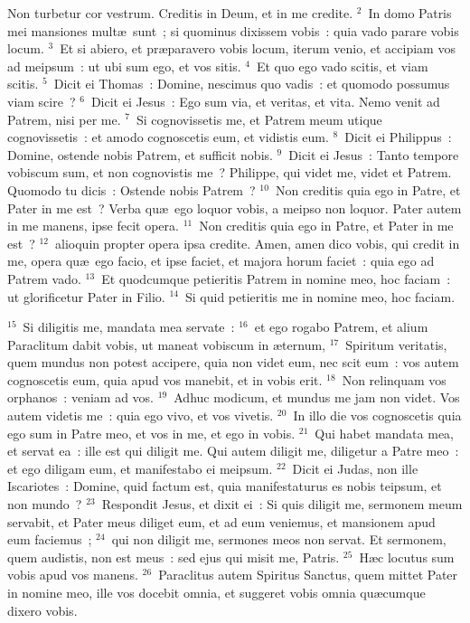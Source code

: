 \lettrine[lines=10,image=true,loversize=0.05,lraise=-0.03]{N}{}on turbetur cor vestrum. Creditis in Deum, et in me credite.
${}^{2}$~In domo Patris mei mansiones mult\ae\ sunt~; si quominus dixissem vobis~: quia vado parare vobis locum.
${}^{3}$~Et si abiero, et pr\ae paravero vobis locum, iterum venio, et accipiam vos ad meipsum~: ut ubi sum ego, et vos sitis.
${}^{4}$~Et quo ego vado scitis, et viam scitis.
${}^{5}$~Dicit ei Thomas~: Domine, nescimus quo vadis~: et quomodo possumus viam scire~?
${}^{6}$~Dicit ei Jesus~: Ego sum via, et veritas, et vita. Nemo venit ad Patrem, nisi per me.
${}^{7}$~Si cognovissetis me, et Patrem meum utique cognovissetis~: et amodo cognoscetis eum, et vidistis eum.
${}^{8}$~Dicit ei Philippus~: Domine, ostende nobis Patrem, et sufficit nobis.
${}^{9}$~Dicit ei Jesus~: Tanto tempore vobiscum sum, et non cognovistis me~? Philippe, qui videt me, videt et Patrem. Quomodo tu dicis~: Ostende nobis Patrem~?
${}^{10}$~Non creditis quia ego in Patre, et Pater in me est~? Verba qu\ae\ ego loquor vobis, a meipso non loquor. Pater autem in me manens, ipse fecit opera.
${}^{11}$~Non creditis quia ego in Patre, et Pater in me est~?
${}^{12}$~alioquin propter opera ipsa credite. Amen, amen dico vobis, qui credit in me, opera qu\ae\ ego facio, et ipse faciet, et majora horum faciet~: quia ego ad Patrem vado.
${}^{13}$~Et quodcumque petieritis Patrem in nomine meo, hoc faciam~: ut glorificetur Pater in Filio.
${}^{14}$~Si quid petieritis me in nomine meo, hoc faciam.


${}^{15}$~Si diligitis me, mandata mea servate~:
${}^{16}$~et ego rogabo Patrem, et alium Paraclitum dabit vobis, ut maneat vobiscum in \ae ternum,
${}^{17}$~Spiritum veritatis, quem mundus non potest accipere, quia non videt eum, nec scit eum~: vos autem cognoscetis eum, quia apud vos manebit, et in vobis erit.
${}^{18}$~Non relinquam vos orphanos~: veniam ad vos.
${}^{19}$~Adhuc modicum, et mundus me jam non videt. Vos autem videtis me~: quia ego vivo, et vos vivetis.
${}^{20}$~In illo die vos cognoscetis quia ego sum in Patre meo, et vos in me, et ego in vobis.
${}^{21}$~Qui habet mandata mea, et servat ea~: ille est qui diligit me. Qui autem diligit me, diligetur a Patre meo~: et ego diligam eum, et manifestabo ei meipsum.
${}^{22}$~Dicit ei Judas, non ille Iscariotes~: Domine, quid factum est, quia manifestaturus es nobis teipsum, et non mundo~?
${}^{23}$~Respondit Jesus, et dixit ei~: Si quis diligit me, sermonem meum servabit, et Pater meus diliget eum, et ad eum veniemus, et mansionem apud eum faciemus~;
${}^{24}$~qui non diligit me, sermones meos non servat. Et sermonem, quem audistis, non est meus~: sed ejus qui misit me, Patris.
${}^{25}$~H\ae c locutus sum vobis apud vos manens.
${}^{26}$~Paraclitus autem Spiritus Sanctus, quem mittet Pater in nomine meo, ille vos docebit omnia, et suggeret vobis omnia qu\ae cumque dixero vobis.


